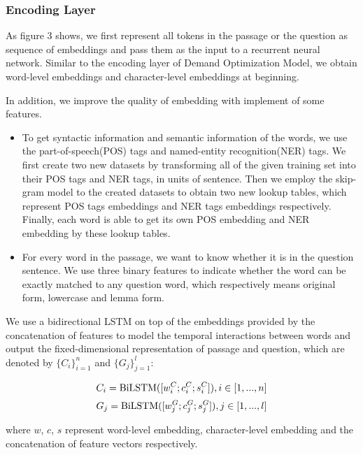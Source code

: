 \documentclass[sigconf]{acmart}
\begin{document}
\subsubsection{\textbf{Encoding Layer}}
As figure 3 shows, we first represent all tokens in the passage or the question as sequence of embeddings and pass them as the input to a recurrent neural network\cite{mikolov2010recurrent}. Similar to the encoding layer of Demand Optimization Model, we obtain word-level embeddings and character-level embeddings at beginning. 


In addition, we improve the quality of embedding with implement of some features.
\begin{itemize}

\item To get syntactic information and semantic information of the words, we use the part-of-speech(POS) tags and named-entity recognition(NER) tags. We first create two new datasets by transforming all of the given training set into their POS tags and NER tags, in units of sentence. Then we employ the skip-gram model\cite{mikolov2013distributed} to the created datasets to obtain two new lookup tables, which represent POS tags embeddings and NER tags embeddings respectively. Finally, each word is able to get its own POS embedding and NER embedding by these lookup tables.

\item For every word in the passage, we want to know whether it is in the question sentence. We use three binary features to indicate whether the word can be exactly matched to any question word, which respectively means original form, lowercase and lemma form.

\end{itemize}



We use a bidirectional LSTM on top of the embeddings provided by the concatenation of features to model the temporal interactions between words and output the fixed-dimensional representation of passage and question, which are denoted by $\{ C_{i} \}^{n}_{i=1}$ and $\{ G_{j} \}^{l}_{j=1}$:

 $$C_{i} = {\rm BiLSTM}([w^{C}_{i}; c^{C}_{i}; s^{C}_{i}]), i \in [1,...,n]$$
 $$G_{j} = {\rm BiLSTM}([w^{G}_{j}; c^{G}_{j}; s^{G}_{j}]), j \in [1,...,l]$$
 
where $w$, $c$, $s$ represent word-level embedding, character-level embedding and the concatenation of feature vectors respectively.
\end{document}
